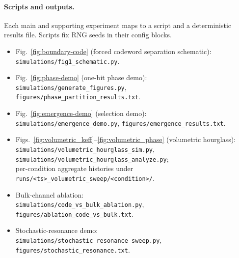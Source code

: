\documentclass[12pt]{article}
\theoremstyle{definition}
\begin{document}
\paragraph{Scripts and outputs.} Each main and supporting experiment maps to a script and a deterministic results file. Scripts fix RNG seeds in their config blocks.

{\sloppy
\begin{itemize}
\setlength\itemsep{0pt}
\item Fig.~\ref{fig:boundary-code} (forced codeword separation schematic): \\ \texttt{simulations/fig1\_schematic.py}.
\item Fig.~\ref{fig:phase-demo} (one-bit phase demo): \\ \texttt{simulations/generate\_figures.py}, \texttt{figures/phase\_partition\_results.txt}.
\item Fig.~\ref{fig:emergence-demo} (selection demo): \\ \texttt{simulations/emergence\_demo.py}, \texttt{figures/emergence\_results.txt}.
\item Figs.~\ref{fig:volumetric_keff}--\ref{fig:volumetric_phase} (volumetric hourglass): \\
  \texttt{simulations/volumetric\_hourglass\_sim.py}, \\
  \texttt{simulations/volumetric\_hourglass\_analyze.py}; \\
  per-condition aggregate histories under \texttt{runs/<ts>\_volumetric\_sweep/<condition>/}.
\item Bulk-channel ablation: \\
  \texttt{simulations/code\_vs\_bulk\_ablation.py}, \\ \texttt{figures/ablation\_code\_vs\_bulk.txt}.
\item Stochastic-resonance demo: \\
  \texttt{simulations/stochastic\_resonance\_sweep.py}, \\ \texttt{figures/stochastic\_resonance.txt}.
\end{itemize}
}



\end{document}
